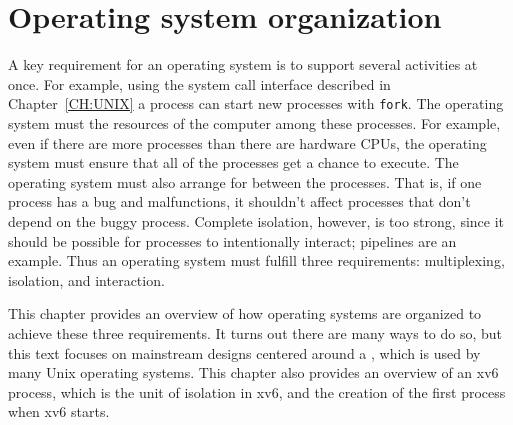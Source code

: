 
\chapter{Operating system organization}
\label{CH:FIRST}

A key requirement for an operating system is to support several activities at once.  For
example, using the system call interface described in
Chapter~\ref{CH:UNIX}
a process can start new processes with 
\lstinline{fork}.
The operating system must 
the resources of the computer among these processes.
For example, even if there are more processes
than there are hardware CPUs, the operating
system must ensure that all of the processes
get a chance to execute.  The operating system must also arrange for
between the processes.
That is, if one process has a bug and malfunctions,
it shouldn't affect processes that
don't depend on the buggy process.
Complete isolation, however, is too strong, since it should be possible for
processes to intentionally interact; pipelines are an example.
Thus
an operating system must fulfill three requirements: multiplexing, isolation,
and interaction.

This chapter provides an overview of how operating systems are
organized to achieve these three requirements.  It turns out there are
many ways to do so, but this text focuses on mainstream designs
centered around a , which is used by many
Unix operating systems.  This chapter also provides an overview of an
xv6 process, which is the unit of isolation in xv6, and the
creation of the first process when xv6 starts.

